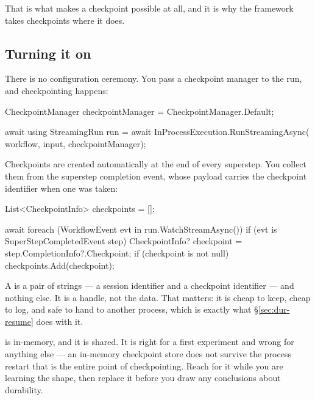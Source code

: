 That is what makes a checkpoint possible at all, and it is why the framework
takes checkpoints where it does.

\subsection{Turning it on}

There is no configuration ceremony. You pass a checkpoint manager to the run, and
checkpointing happens:

\begin{csharp}[caption={A checkpointed run}, label={lst:dur-enable}]
CheckpointManager checkpointManager = CheckpointManager.Default;

await using StreamingRun run = await InProcessExecution.RunStreamingAsync(
    workflow, input, checkpointManager);
\end{csharp}

Checkpoints are created automatically at the end of every superstep. You collect
them from the superstep completion event, whose payload carries the checkpoint
identifier when one was taken:

\begin{csharp}[caption={Collecting checkpoint identifiers}, label={lst:dur-collect}]
List<CheckpointInfo> checkpoints = [];

await foreach (WorkflowEvent evt in run.WatchStreamAsync())
{
    if (evt is SuperStepCompletedEvent step)
    {
        CheckpointInfo? checkpoint = step.CompletionInfo?.Checkpoint;
        if (checkpoint is not null)
        {
            checkpoints.Add(checkpoint);
        }
    }
}
\end{csharp}

A  is a pair of strings --- a session identifier and a
checkpoint identifier --- and nothing else. It is a handle, not the data. That
matters: it is cheap to keep, cheap to log, and safe to hand to another process,
which is exactly what \S\ref{sec:dur-resume} does with it.

\begin{note}
 is in-memory, and it is shared. It is right for
a first experiment and wrong for anything else --- an in-memory checkpoint store
does not survive the process restart that is the entire point of checkpointing.
Reach for it while you are learning the shape, then replace it before you draw
any conclusions about durability.
\end{note}

